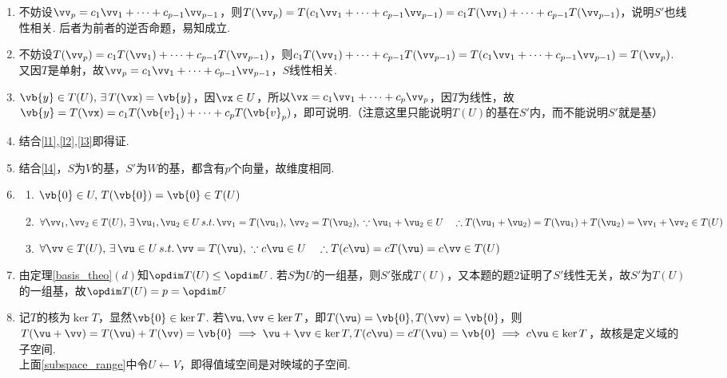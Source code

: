 \begin{analysis}
\begin{enumerate}
\item 不妨设$\vv_p=c_1\vv_1+\cdots+c_{p-1}\vv_{p-1}$，则$T(\vv_p)=T(c_1\vv_1+\cdots+c_{p-1}\vv_{p-1})=c_1T(\vv_1)+\cdots+c_{p-1}T(\vv_{p-1})$，说明$S'$也线性相关. 后者为前者的逆否命题，易知成立.
\item 不妨设$T(\vv_p)=c_1T(\vv_1)+\cdots+c_{p-1}T(\vv_{p-1})$，则$c_1T(\vv_1)+\cdots+c_{p-1}T(\vv_{p-1})=T(c_1\vv_1+\cdots+c_{p-1}\vv_{p-1})=T(\vv_p)$. 又因$T$是单射，故$\vv_p=c_1\vv_1+\cdots+c_{p-1}\vv_{p-1}$，$S$线性相关.
\item $\vb{y}\in T(U),\,\exists\,T(\vx)=\vb{y}$，因$\vx\in U$，所以$\vx=c_1\vv_1+\cdots+c_p\vv_p$，因$T$为线性，故$\vb{y}=T(\vx)=c_1T(\vb{v}_1)+\cdots+c_pT(\vb{v}_p)$，即可说明.（注意这里只能说明$T(U)$的基在$S'$内，而不能说明$S'$就是基）
\item 结合\ref{l1},\ref{l2},\ref{l3}即得证.
\item 结合\ref{l4}，$S$为$V$的基，$S'$为$W$的基，都含有$p$个向量，故维度相同.
\item \begin{enumerate}
	\item $\vb{0}\in U,\,T(\vb{0})=\vb{0}\in T(U)$
	\item $\forall\vv_1,\vv_2\in T(U),\,\exists\,\vu_1,\vu_2\in U\,s.t.\,\vv_1=T(\vu_1),\,\vv_2=T(\vu_2),\\
	\because \vu_1+\vu_2\in U\quad\therefore T(\vu_1+\vu_2)=T(\vu_1)+T(\vu_2)=\vv_1+\vv_2 \in T(U)$
	\item $\forall\vv\in T(U),\,\exists\,\vu\in U\,s.t.\,\vv=T(\vu),\\
	\because c\vu\in U\quad\therefore T(c\vu)=cT(\vu)=c\vv\in T(U)$
\end{enumerate}
\item 由定理\ref{basis_theo}$(d)$知$\opdim T(U)\leq\opdim U$. 若$S$为$U$的一组基，则$S'$张成$T(U)$，又本题的题$2$证明了$S'$线性无关，故$S'$为$T(U)$的一组基，故$\opdim T(U)=p=\opdim U$
\item 记$T$的核为$\ker T$，显然$\vb{0}\in\ker T$. 若$\vu,\vv\in \ker T$，即$T(\vu)=\vb{0},T(\vv)=\vb{0}$，则$T(\vu+\vv)=T(\vu)+T(\vv)=\vb{0}\implies \vu+\vv\in \ker T,T(c\vu)=cT(\vu)=\vb{0}\implies c\vu\in\ker T$，故核是定义域的子空间.\\
上面\ref{subspace_range}中令$U\gets V$，即得值域空间是对映域的子空间.
\end{enumerate}
\end{analysis}

